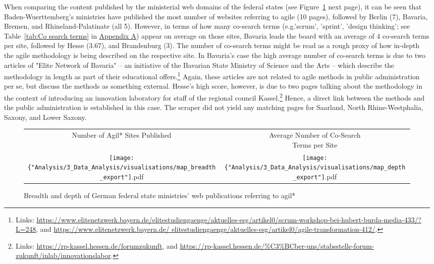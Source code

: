 When comparing the content published by the ministerial web domains of the federal states (see Figure~\ref{fig:map} next page), it can be seen that Baden-Wuerttemberg's ministries have published the most number of websites referring to agile (10 pages), followed by Berlin (7), Bavaria, Bremen, and Rhineland-Palatinate (all 5). However, in terms of how many co-search terms (e.g.'scrum', 'sprint', 'design thinking'; see Table~\ref{tab:Co search terms} in \href{Appendix A}{Appendix A}) appear on average on those sites, Bavaria leads the board with an average of 4 co-search terms per site, followed by Hesse (3.67), and Brandenburg (3). The number of co-search terms might be read as a rough proxy of how in-depth the agile methodology is being described on the respective site. In Bavaria's case the high average number of co-search terms is due to two articles of "Elite Network of Bavaria" – an initiative of the Bavarian State Ministry of Science and the Arts – which describe the methodology in length as part of their educational offers.\footnote{Links: \href{https://www.elitenetzwerk.bayern.de/elitestudiengaenge/aktuelles-esg/artikel0/scrum-workshop-bei-hubert-burda-media-433/?L=248}{https://www.elitenetzwerk.bayern.de/elitestudiengaenge/aktuelles-esg/artikel0/scrum-workshop-bei-hubert-burda-media-433/?L=248}, and \href{https://www.elitenetzwerk.bayern.de/elitestudiengaenge/aktuelles-esg/artikel0/agile-transformation-412/}{https://www.elitenetzwerk.bayern.de/ elitestudiengaenge/aktuelles-esg/artikel0/agile-transformation-412/}.} Again, these articles are not related to agile methods in public administration per se, but discuss the methods as something external. Hesse's high score, however, is due to two pages talking about the methodology in the context of introducing an innovation laboratory for staff of the regional council Kassel.\footnote{Links: \href{https://rp-kassel.hessen.de/forumzukunft}{  https://rp-kassel.hessen.de/forumzukunft}, and \href{https://rp-kassel.hessen.de/\%C3\%BCber-uns/stabsstelle-forum-zukunft/inlab/innovationslabor}{https://rp-kassel.hessen.de/\%C3\%BCber-uns/stabsstelle-forum-zukunft/inlab/innovationslabor}.} Hence, a direct link between the methods and the public administration is established in this case. The scraper did not yield any matching pages for Saarland, North Rhine-Westphalia, Saxony, and Lower Saxony.
\begin{figure}[ht!]
	\centering
	\begin{tabular}{c c}
    Number of Agil* Sites Published & \makecell{Average Number of Co-Search \\ Terms per Site} \\
	\texttt{[image: \{"Analysis/3\_Data\_Analysis/visualisations/map\_breadth\_export"]}.pdf} &
	\texttt{[image: \{"Analysis/3\_Data\_Analysis/visualisations/map\_depth\_export"]}.pdf}
	\end{tabular}
	\setlength{\belowcaptionskip}{-10pt}
	\caption[Breadth and depth of German federal state ministries' web publications referring to agil*]{Breadth and depth of German federal state ministries' web publications referring to agil*}
	\label{fig:map}
\end{figure}

